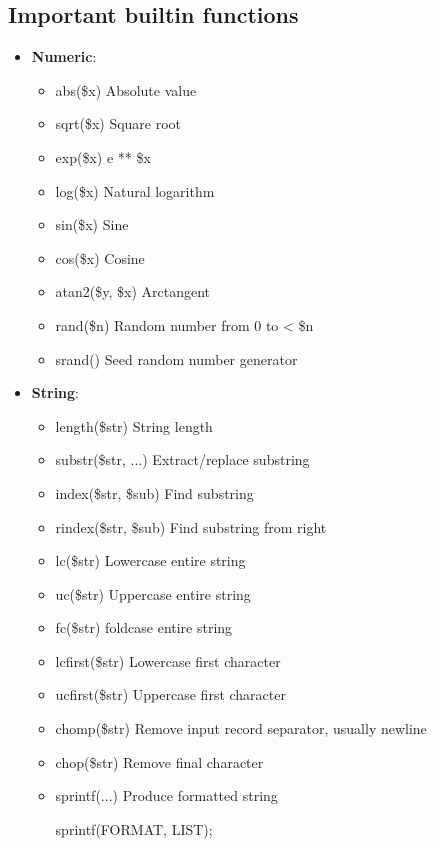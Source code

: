 \documentclass{report}
\begin{document}
    \subsection{Important builtin functions}
    \begin{itemize}
        \item \textbf{Numeric}:
            \begin{itemize}
                \item abs(\$x)	Absolute value
                \item sqrt(\$x)	Square root
                \item exp(\$x)	e ** \$x
                \item log(\$x)	Natural logarithm
                \item sin(\$x)	Sine
                \item cos(\$x)	Cosine
                \item atan2(\$y, \$x)	Arctangent
                \item rand(\$n)	Random number from 0 to < \$n
                \item srand()	Seed random number generator
            \end{itemize}
        \item \textbf{String}:
            \begin{itemize}
                \item length(\$str)	String length
                \item substr(\$str, ...)	Extract/replace substring
                \item index(\$str, \$sub)	Find substring
                \item rindex(\$str, \$sub)	Find substring from right
                \item lc(\$str)	Lowercase entire string
                \item uc(\$str)	Uppercase entire string
                \item fc(\$str) foldcase entire string
                \item lcfirst(\$str)	Lowercase first character
                \item ucfirst(\$str)	Uppercase first character
                \item chomp(\$str)	Remove input record separator, usually newline
                \item chop(\$str)	Remove final character
                \item sprintf(...)	Produce formatted string
                    \bigbreak \noindent 
                    \begin{perlcode}
                    sprintf(FORMAT, LIST);


\end{perlcode}
\end{itemize}
\end{itemize}
\end{document}
